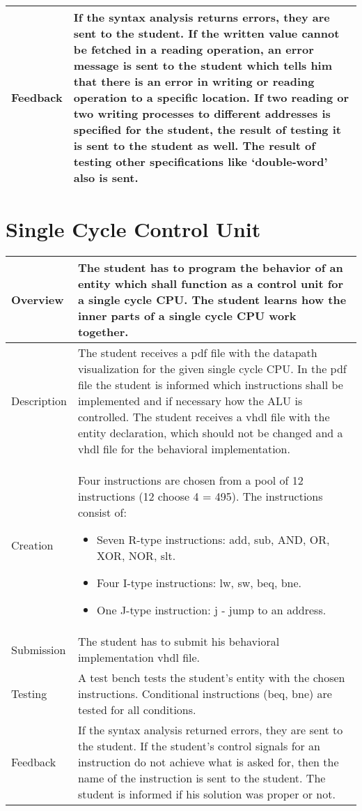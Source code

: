     \begin{tabular}{|p{2cm}|p{11cm}|}
        \hline
        Feedback & If the syntax analysis returns errors, they are sent to the student. If the written value cannot be fetched in a reading operation, 
        an error message is sent to the student which tells him that there is an error in writing or reading operation to a specific location. If two 
        reading or two writing processes to different addresses is specified for the student, the result of testing it is sent to the student as well. 
        The result of testing other specifications like ‘double-word’ also is sent. 
        \\
        \hline 
    \end{tabular}

\newpage

\section{Single Cycle Control Unit} \label{SC_CU}
    \begin{tabular}{|p{2cm}|p{11cm}|}
        \hline
        Overview & The student has to program the behavior of an entity which shall function as a control unit for a single cycle CPU. The student learns how the inner parts of a single cycle CPU work together.
        \\
        \hline
        Description & The student receives a pdf file with the datapath visualization for the given single cycle CPU. In the pdf file the student is informed which instructions shall be implemented and if necessary how the ALU is controlled. The student receives a vhdl file with the entity declaration, which should not be changed and a vhdl file for the behavioral implementation.
        \\
        \hline
        Creation & Four instructions are chosen from a pool of 12 instructions (12 choose 4 = 495). The instructions consist of:
        \begin{itemize}
            \item Seven R-type instructions: add, sub, AND, OR, XOR, NOR, slt.
            \item Four I-type instructions: lw, sw, beq, bne.
            \item One J-type instruction: j - jump to an address.
        \end{itemize}
        \\
        \hline
        Submission & The student has to submit his behavioral implementation vhdl file.
        \\
        \hline
        Testing & A test bench tests the student's entity with the chosen instructions. Conditional instructions (beq, bne) are tested for all conditions.
        \\
        \hline
        Feedback & If the syntax analysis returned errors, they are sent to the student. If the student's control signals for an instruction do not achieve what is asked for, then the name of the instruction is sent to the student. The student is informed if his solution was proper or not.
        \\
        \hline 
    \end{tabular}

